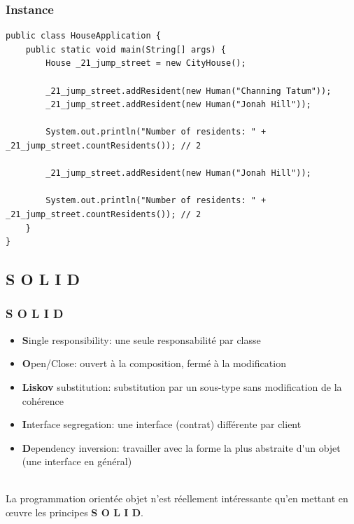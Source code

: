 \begin{frame}[fragile]
\frametitle{Instance}
\begin{lstlisting}
public class HouseApplication {
	public static void main(String[] args) {
		House _21_jump_street = new CityHouse();

		_21_jump_street.addResident(new Human("Channing Tatum"));
		_21_jump_street.addResident(new Human("Jonah Hill"));

		System.out.println("Number of residents: " + _21_jump_street.countResidents()); // 2

		_21_jump_street.addResident(new Human("Jonah Hill"));

		System.out.println("Number of residents: " + _21_jump_street.countResidents()); // 2
	}
}
	\end{lstlisting}
\end{frame}

\subsection{S O L I D}

\begin{frame}
	\frametitle{S O L I D}
	\begin{itemize}
    	\item \textbf{S}ingle responsibility: une seule responsabilit\'{e} par classe
		\item \textbf{O}pen/Close: ouvert \`{a} la composition, ferm\'{e} \`{a} la modification
		\item \textbf{Liskov} substitution: substitution par un sous-type sans modification de la coh\'{e}rence
		\item \textbf{I}nterface segregation: une interface (contrat) diff\'{e}rente par client
		\item \textbf{D}ependency inversion: travailler avec la forme la plus abstraite d\'{}un objet (une interface en g\'{e}n\'{e}ral)
    \end{itemize}
    ~\\
    La programmation orient\'{e}e objet n'est r\'{e}ellement int\'{e}ressante qu'en mettant en \oe{}uvre les principes \textbf{S O L I D}.
\end{frame}


